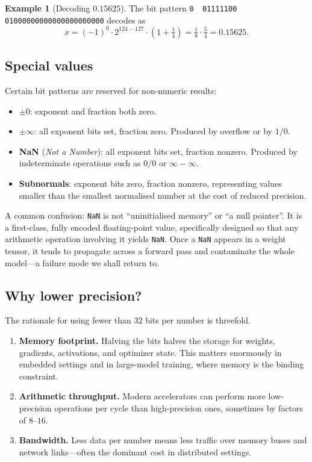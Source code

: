 \documentclass[11pt,a4paper]{article}
\theoremstyle{definition}
\newtheorem{example}[definition]{Example}
\theoremstyle{remark}
\theoremstyle{plain}
\begin{document}
\begin{example}[Decoding $0.15625$]
The bit pattern
\texttt{0\,\,01111100\,\,01000000000000000000000} decodes as
\[
x = (-1)^0 \cdot 2^{124-127} \cdot \left(1 + \tfrac{1}{4}\right)
  = \tfrac{1}{8} \cdot \tfrac{5}{4} = 0.15625.
\]
\end{example}

\subsection{Special values}

Certain bit patterns are reserved for non-numeric results:
\begin{itemize}[leftmargin=1.5em, itemsep=2pt]
    \item \textbf{$\pm 0$}: exponent and fraction both zero.
    \item \textbf{$\pm\infty$}: all exponent bits set, fraction zero.
          Produced by overflow or by $1/0$.
    \item \textbf{NaN} (\emph{Not a Number}): all exponent bits set,
          fraction nonzero. Produced by indeterminate operations such as
          $0/0$ or $\infty - \infty$.
    \item \textbf{Subnormals}: exponent bits zero, fraction nonzero,
          representing values smaller than the smallest normalised number
          at the cost of reduced precision.
\end{itemize}

A common confusion: \texttt{NaN} is not ``uninitialised memory'' or ``a
null pointer''. It is a first-class, fully encoded floating-point value,
specifically designed so that any arithmetic operation involving it
yields \texttt{NaN}. Once a \texttt{NaN} appears in a weight tensor, it
tends to propagate across a forward pass and contaminate the whole
model---a failure mode we shall return to.

\subsection{Why lower precision?}

The rationale for using fewer than $32$ bits per number is threefold.

\begin{enumerate}[leftmargin=1.8em, itemsep=2pt]
    \item \textbf{Memory footprint.} Halving the bits halves the storage
          for weights, gradients, activations, and optimizer state. This
          matters enormously in embedded settings and in large-model
          training, where memory is the binding constraint.
    \item \textbf{Arithmetic throughput.} Modern accelerators can perform
          more low-precision operations per cycle than high-precision
          ones, sometimes by factors of $8$--$16$.
    \item \textbf{Bandwidth.} Less data per number means less traffic
          over memory buses and network links---often the dominant cost
          in distributed settings.
\end{enumerate}
\end{document}
